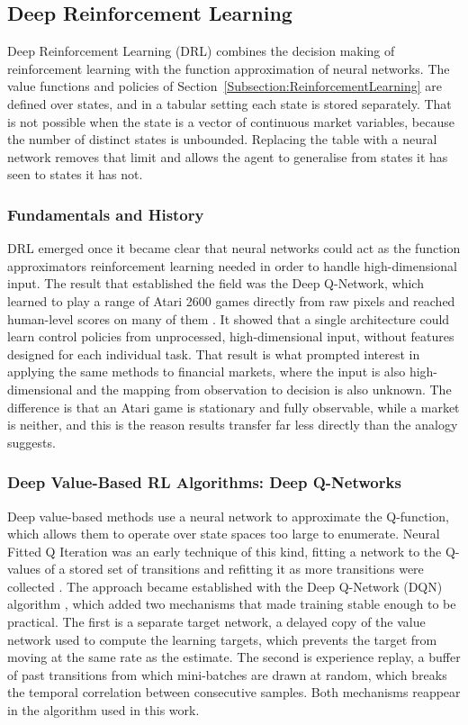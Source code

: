 \subsection{Deep Reinforcement Learning}
\label{Subsection:DeepReinforcementLearning}

Deep Reinforcement Learning (DRL) combines the decision making of reinforcement learning with the function approximation of neural networks. The value functions and policies of Section~\ref{Subsection:ReinforcementLearning} are defined over states, and in a tabular setting each state is stored separately. That is not possible when the state is a vector of continuous market variables, because the number of distinct states is unbounded. Replacing the table with a neural network removes that limit and allows the agent to generalise from states it has seen to states it has not.

\subsubsection{Fundamentals and History}

DRL emerged once it became clear that neural networks could act as the function approximators reinforcement learning needed in order to handle high-dimensional input. The result that established the field was the Deep Q-Network, which learned to play a range of Atari 2600 games directly from raw pixels and reached human-level scores on many of them \cite{mnih_playing_2013, mnih_human-level_2015}. It showed that a single architecture could learn control policies from unprocessed, high-dimensional input, without features designed for each individual task. That result is what prompted interest in applying the same methods to financial markets, where the input is also high-dimensional and the mapping from observation to decision is also unknown. The difference is that an Atari game is stationary and fully observable, while a market is neither, and this is the reason results transfer far less directly than the analogy suggests.

\subsubsection{Deep Value-Based RL Algorithms: Deep Q-Networks}

Deep value-based methods use a neural network to approximate the Q-function, which allows them to operate over state spaces too large to enumerate. Neural Fitted Q Iteration was an early technique of this kind, fitting a network to the Q-values of a stored set of transitions and refitting it as more transitions were collected \cite{riedmiller_neural_2005}. The approach became established with the Deep Q-Network (DQN) algorithm \cite{mnih_human-level_2015}, which added two mechanisms that made training stable enough to be practical. The first is a separate target network, a delayed copy of the value network used to compute the learning targets, which prevents the target from moving at the same rate as the estimate. The second is experience replay, a buffer of past transitions from which mini-batches are drawn at random, which breaks the temporal correlation between consecutive samples. Both mechanisms reappear in the algorithm used in this work.


